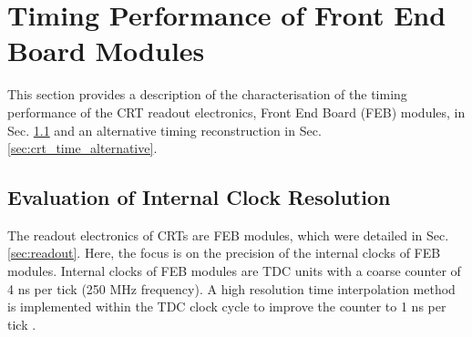 
\section{Timing Performance of Front End Board Modules}
\label{sec4InternalClock}


This section provides a description of the characterisation of the timing performance of the CRT readout electronics, Front End Board (FEB) modules, in Sec. \ref{sec:crt_time_precision} and an alternative timing reconstruction in Sec. \ref{sec:crt_time_alternative}.

\subsection{Evaluation of Internal Clock Resolution}
\label{sec:crt_time_precision}

The readout electronics of CRTs are FEB modules, which were detailed in Sec. \ref{sec:readout}.
Here, the focus is on the precision of the internal clocks of FEB modules. 
Internal clocks of FEB modules are TDC units with a coarse counter of 4 ns per tick (250 MHz frequency). 
A high resolution time interpolation method is implemented within the TDC clock cycle to improve the counter to 1 ns per tick \cite{crt_clock}.

